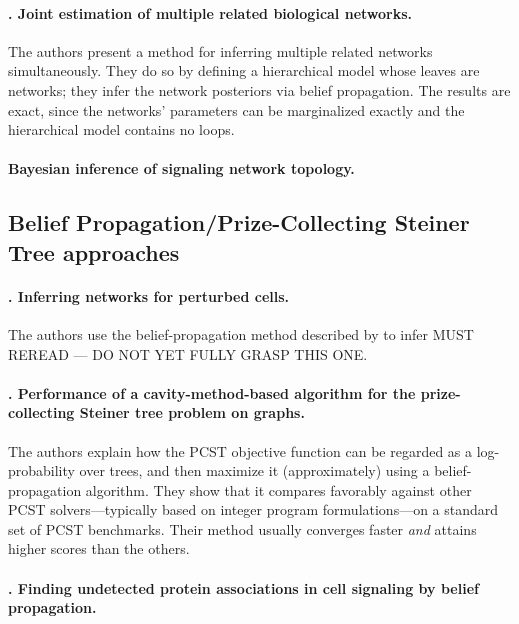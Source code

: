 \documentclass[14pt]{article}
\begin{document}
\paragraph{ \citet{2014-oates-joint}. Joint estimation of multiple related biological networks.}
The authors present a method for inferring multiple related networks simultaneously.
They do so by defining a hierarchical model whose leaves are networks;
they infer the network posteriors via belief propagation.
The results are exact, since the networks' parameters can be marginalized exactly and the hierarchical model contains no loops. 

\paragraph{ \citet{hill-bayesian-2012} Bayesian inference of signaling network topology.}




\subsection{Belief Propagation/Prize-Collecting Steiner Tree approaches}

\paragraph{ \citet{2013-molinelli-perturbation}. Inferring networks for perturbed cells.}
The authors use the belief-propagation method described by \citeauthor{2012-biazzo-steiner} to infer 
MUST REREAD --- DO NOT YET FULLY GRASP THIS ONE.

\paragraph{ \citet{2012-biazzo-steiner}. Performance of a cavity-method-based algorithm for the prize-collecting Steiner tree problem on graphs.}
The authors explain how the PCST objective function can be regarded as a log-probability over trees, and then maximize it (approximately) using a belief-propagation algorithm.
They show that it compares favorably against other PCST solvers---typically based on integer program formulations---on a standard set of PCST benchmarks.
Their method usually converges faster \emph{and} attains higher scores than the others.

\paragraph{ \citet{2011-bailly-bechet-belief}. Finding undetected protein associations in cell signaling by belief propagation.}
\end{document}
